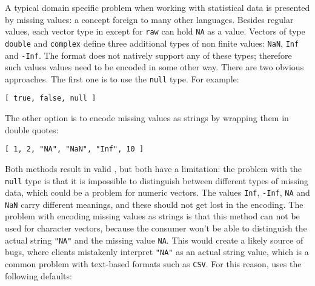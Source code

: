 A typical domain specific problem when working with statistical data is presented by missing values: a concept foreign to many other languages. Besides regular values, each vector type in \R except for \texttt{raw} can hold \texttt{NA} as a value. Vectors of type \texttt{double} and \texttt{complex} define three additional types of non finite values: \texttt{NaN}, \texttt{Inf} and \texttt{-Inf}. The \JSON format does not natively support any of these types; therefore such values values need to be encoded in some other way. There are two obvious approaches. The first one is to use the  \JSON \texttt{null} type. For example:

\begin{knitrout}\mycodesize
{}\color{fgcolor}\begin{kframe}
\begin{alltt}
 \hlkwb{<-} \hlstd{(}\hlstd{,} \hlstd{,} \hlstd{)}
\hlstd{(}
\end{alltt}
\begin{verbatim}
[ true, false, null ]
\end{verbatim}
\end{kframe}
\end{knitrout}


The other option is to encode missing values as strings by wrapping them in double quotes:

\begin{knitrout}\mycodesize
{}\color{fgcolor}\begin{kframe}
\begin{alltt}
 \hlkwb{<-} \hlstd{(}\hlstd{,} \hlstd{,} \hlstd{,} \hlstd{,} \hlstd{,} \hlstd{)}
\hlstd{(}
\end{alltt}
\begin{verbatim}
[ 1, 2, "NA", "NaN", "Inf", 10 ]
\end{verbatim}
\end{kframe}
\end{knitrout}


Both methods result in valid \JSON, but both have a limitation: the problem with the \texttt{null} type is that it is impossible to distinguish between different types of missing data, which could be a problem for numeric vectors. The values \texttt{Inf}, \texttt{-Inf}, \texttt{NA} and \texttt{NaN} carry different meanings, and these should not get lost in the encoding. The problem with encoding missing values as strings is that this method can not be used for character vectors, because the consumer won't be able to distinguish the actual string \texttt{"NA"} and the missing value \texttt{NA}. This would create a likely source of bugs, where clients mistakenly interpret \texttt{"NA"} as an actual string value, which is a common problem with text-based formats such as \texttt{CSV}. For this reason, \jsonlite uses the following defaults:

